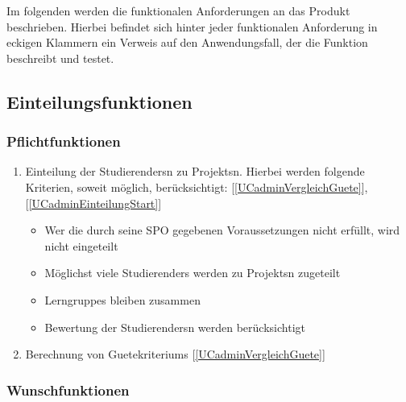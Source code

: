 \documentclass[parskip=full]{scrartcl}
\newcommand{\swtLabel}[1]{\textbf{/#1\arabic*0/}}
\newcommand{\testRef}[1]{[\ref{#1}]}
\begin{document}
Im folgenden werden die funktionalen Anforderungen an das Produkt beschrieben.
Hierbei befindet sich hinter jeder funktionalen Anforderung in eckigen Klammern
ein Verweis auf den Anwendungsfall, der die Funktion beschreibt und testet.

\subsection{\gls{Einteilung}sfunktionen}
\subsubsection{Pflichtfunktionen}
\begin{enumerate}[label=\swtLabel{FA}]
  \item \gls{Einteilung} der \glspl{Studierender}n zu \glspl{Projekt}n. Hierbei werden
  folgende Kriterien, soweit möglich, berücksichtigt: \testRef{UCadminVergleichGuete},
  \testRef{UCadminEinteilungStart}
  \begin{itemize}
    \item Wer die durch seine \gls{SPO} gegebenen Voraussetzungen nicht erfüllt,
    wird nicht eingeteilt \label{FAeinteilung}
    \item Möglichst viele \glspl{Studierender} werden zu \glspl{Projekt}n zugeteilt 
    \item \glspl{Lerngruppe} bleiben zusammen
    \item \gls{Bewertung} der \glspl{Studierender}n werden berücksichtigt 
 \end{itemize} \label{FAeinteilungMussKriterien} 
 \item Berechnung von \glspl{Guetekriterium} \label{FAguetekriterien}
 \testRef{UCadminVergleichGuete}
 
\end{enumerate}

 \subsubsection{Wunschfunktionen}
 
\end{document}
